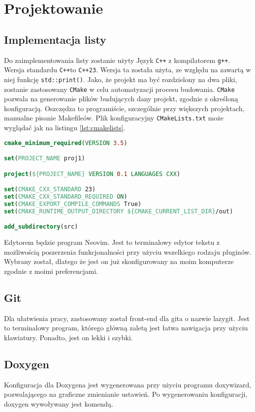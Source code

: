 	\newpage
\section{Projektowanie}		%

\subsection{Implementacja listy}

Do zaimplementowania listy zostanie użyty Język \texttt{C++} z kompilatorem \texttt{g++}. Wersja standardu \texttt{C++}to \texttt{C++23}. Wersja ta została użyta, ze względu na zawartą w niej funkcję \texttt{std::print()}. Jako, że projekt ma być rozdzielony na dwa pliki, zostanie zastosowany \texttt{CMake} w celu automatyzacji procesu budowania. \texttt{CMake} pozwala na generowanie plików budujących dany projekt, zgodnie z określoną konfiguracją. Oszczędza to programiście, szczególnie przy większych projektach, manualne pisanie Makefileów. Plik konfiguracyjny \texttt{CMakeLists.txt} może wyglądać jak na listingu \ref{lst:cmakelists}.

\begin{lstlisting}[caption=Plik konfiguracyjny CMake, label={lst:cmakelists}, language=CMake]
cmake_minimum_required(VERSION 3.5)

set(PROJECT_NAME proj1)

project(${PROJECT_NAME} VERSION 0.1 LANGUAGES CXX)

set(CMAKE_CXX_STANDARD 23)
set(CMAKE_CXX_STANDARD_REQUIRED ON)
set(CMAKE_EXPORT_COMPILE_COMMANDS True)
set(CMAKE_RUNTIME_OUTPUT_DIRECTORY ${CMAKE_CURRENT_LIST_DIR}/out)

add_subdirectory(src)

\end{lstlisting}
Edytorem będzie program Neovim. Jest to terminalowy edytor tekstu z możliwością poszerzenia funkcjonalności przy użyciu wszelkiego rodzaju pluginów. Wybrany został, dlatego że jest on już skonfigurowany na moim komputerze zgodnie z moimi preferencjami. 
\subsection{Git}

Dla ułatwienia pracy, zastosowany został front-end dla gita o nazwie lazygit. Jest to terminalowy program, którego główną zaletą jest łatwa nawigacja przy użyciu klawiatury. Ponadto, jest on lekki i szybki.

\subsection{Doxygen}

Konfiguracja dla Doxygena jest wygenerowana przy użyciu programu doxywizard, pozwalającego na graficzne zmienianie ustawień. Po wygenerowaniu konfiguracji, doxygen wywoływany jest komendą. 

